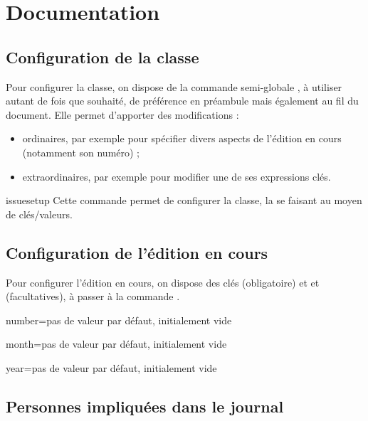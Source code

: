 \chapter{Documentation}
\label{cha:documentation}

\section{Configuration de la classe}

Pour configurer la classe, on dispose de la commande semi-globale
, à utiliser autant de fois que souhaité, de préférence en
préambule mais également au fil du document. Elle permet d'apporter des
modifications :
\begin{itemize}
\item ordinaires, par exemple pour spécifier divers aspects de l'édition en
  cours (notamment son numéro) ;
\item extraordinaires, par exemple pour modifier une de ses expressions clés.
\end{itemize}

\begin{docCommand}{issuesetup}{}
  Cette commande permet de configurer la classe, la  se
  faisant au moyen de clés/valeurs.
\end{docCommand}

\section{Configuration de l'édition en cours}

Pour configurer l'édition en cours, on dispose des clés 
(obligatoire) et  et  (facultatives), à passer à la
commande .

\begin{docKey}{number}{=}{pas de valeur par défaut,
    initialement vide}
\end{docKey}

\begin{docKey}{month}{=}{pas de valeur par défaut,
    initialement vide}
\end{docKey}

\begin{docKey}{year}{=}{pas de valeur par défaut,
    initialement vide}
\end{docKey}

\section{Personnes impliquées dans le journal}
\label{sec:pers-impl-dans}

